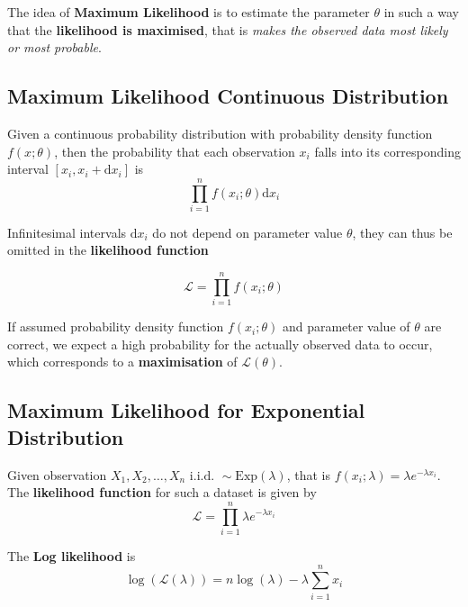 \documentclass[11pt]{article}
\theoremstyle{definition}
\begin{document}
The idea of \textbf{Maximum Likelihood} is to estimate the parameter $\theta$ in such a way that the \textbf{likelihood is maximised}, that is \emph{makes the observed data most likely or most probable}.

\subsection{Maximum Likelihood Continuous Distribution}
Given a continuous probability distribution  with probability density function $f (x;\theta)$, then the probability that each observation $x_i$ falls into its corresponding interval $[x_i, x_i + \text{d}x_i]$ is
\begin{equation*}
	\prod_{i=1}^{n} f(x_i; \theta) \text{d}x_i
\end{equation*}

Infinitesimal intervals $\text{d}x_i$ do not depend on parameter value $\theta$, they can thus be omitted in the \textbf{likelihood function}

\begin{equation*}
	\mathcal{L} = \prod_{i=1}^{n} f(x_i;\theta)
\end{equation*}

If assumed probability density function $f (x_i ;\theta)$ and parameter value of $\theta$ are correct, we expect a high probability for the actually observed data to occur, which corresponds to a \textbf{maximisation} of $\mathcal{L}(\theta)$.

\subsection{Maximum Likelihood for Exponential Distribution}
Given observation $X_1, X_2, \dots, X_n\text{ i.i.d. }\sim \text{Exp}(\lambda)$, that is $f(x_i;\lambda) = \lambda e^{-\lambda x_i}$. The \textbf{likelihood function} for such a  dataset is given by
\begin{equation*}
	\mathcal{L} = \prod_{i=1}^{n} \lambda e^{-\lambda x_i}
\end{equation*}

The \textbf{Log likelihood} is
\begin{equation*}
	\log(\mathcal{L}(\lambda)) = n\log(\lambda) - \lambda\sum_{i=1}^n x_i
\end{equation*}
\end{document}
